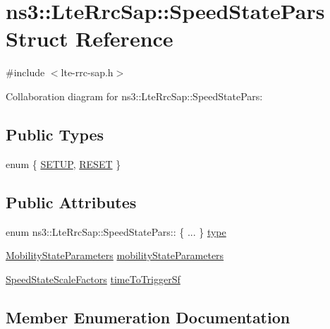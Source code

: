 \hypertarget{structns3_1_1LteRrcSap_1_1SpeedStatePars}{}\section{ns3\+:\+:Lte\+Rrc\+Sap\+:\+:Speed\+State\+Pars Struct Reference}
\label{structns3_1_1LteRrcSap_1_1SpeedStatePars}


{\ttfamily \#include $<$lte-\/rrc-\/sap.\+h$>$}



Collaboration diagram for ns3\+:\+:Lte\+Rrc\+Sap\+:\+:Speed\+State\+Pars\+:
\subsection*{Public Types}
\begin{DoxyCompactItemize}
\item 
enum \{ \hyperlink{structns3_1_1LteRrcSap_1_1SpeedStatePars_a51570eeaecfaab1ca20bdb9df073d0a8a61ba32996ba78b9f21c25297709b8313}{S\+E\+T\+UP}, 
\hyperlink{structns3_1_1LteRrcSap_1_1SpeedStatePars_a51570eeaecfaab1ca20bdb9df073d0a8aaca7f89f48db7f15fe477338c871fe3c}{R\+E\+S\+ET}
 \}
\end{DoxyCompactItemize}
\subsection*{Public Attributes}
\begin{DoxyCompactItemize}
\item 
enum ns3\+::\+Lte\+Rrc\+Sap\+::\+Speed\+State\+Pars\+:: \{ ... \}  \hyperlink{structns3_1_1LteRrcSap_1_1SpeedStatePars_aafe0022dde3c79068f8462ef0e7952e3}{type}
\item 
\hyperlink{structns3_1_1LteRrcSap_1_1MobilityStateParameters}{Mobility\+State\+Parameters} \hyperlink{structns3_1_1LteRrcSap_1_1SpeedStatePars_ab144bfe25ab6796d165b5a03e95469ab}{mobility\+State\+Parameters}
\item 
\hyperlink{structns3_1_1LteRrcSap_1_1SpeedStateScaleFactors}{Speed\+State\+Scale\+Factors} \hyperlink{structns3_1_1LteRrcSap_1_1SpeedStatePars_a4282b6d7164129b5d5375083eae4f22d}{time\+To\+Trigger\+Sf}
\end{DoxyCompactItemize}


\subsection{Member Enumeration Documentation}
